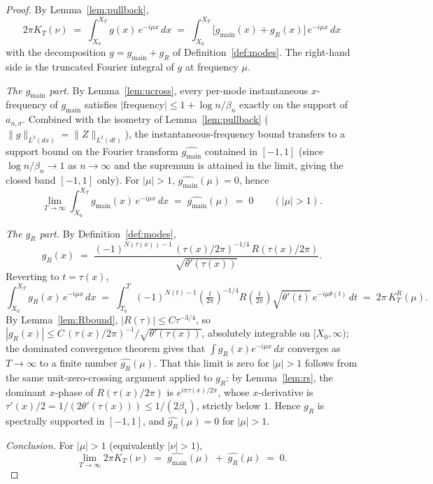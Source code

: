 \documentclass[11pt]{article}
\begin{document}
\begin{proof}
By Lemma~\ref{lem:pullback},
\[
2\pi K_{T}(\nu) \;=\; \int_{X_{0}}^{X_{T}} g(x)\,e^{-i\mu x}\,dx \;=\; \int_{X_{0}}^{X_{T}}\bigl[g_{\mathrm{main}}(x)+g_{R}(x)\bigr]\,e^{-i\mu x}\,dx
\]
with the decomposition $g = g_{\mathrm{main}} + g_{R}$ of Definition~\ref{def:modes}. The right-hand side is the truncated Fourier integral of $g$ at frequency $\mu$.

\emph{The $g_{\mathrm{main}}$ part.} By Lemma~\ref{lem:ucross}, every per-mode instantaneous $x$-frequency of $g_{\mathrm{main}}$ satisfies $|\text{frequency}|\le 1 + \log n/\beta_{n}$ exactly on the support of $a_{n,\sigma}$. Combined with the isometry of Lemma~\ref{lem:pullback} ($\|g\|_{L^{2}(dx)} = \|Z\|_{L^{2}(dt)}$), the instantaneous-frequency bound transfers to a support bound on the Fourier transform $\widehat{g_{\mathrm{main}}}$ contained in $[-1,1]$ (since $\log n/\beta_{n}\to 1$ as $n\to\infty$ and the supremum is attained in the limit, giving the closed band $[-1,1]$ only). For $|\mu|>1$, $\widehat{g_{\mathrm{main}}}(\mu) = 0$, hence
\[
\lim_{T\to\infty}\int_{X_{0}}^{X_{T}} g_{\mathrm{main}}(x)\,e^{-i\mu x}\,dx \;=\; \widehat{g_{\mathrm{main}}}(\mu) \;=\; 0 \qquad (|\mu|>1).
\]

\emph{The $g_{R}$ part.} By Definition~\ref{def:modes},
\[
g_{R}(x) \;=\; \frac{(-1)^{N(\tau(x))-1}\,(\tau(x)/2\pi)^{-1/4}\,R(\tau(x)/2\pi)}{\sqrt{\theta'(\tau(x))}}.
\]
Reverting to $t = \tau(x)$,
\[
\int_{X_{0}}^{X_{T}} g_{R}(x)\,e^{-i\mu x}\,dx \;=\; \int_{T_{0}}^{T}(-1)^{N(t)-1}\!\left(\tfrac{t}{2\pi}\right)^{-1/4}\!R\!\left(\tfrac{t}{2\pi}\right)\sqrt{\theta'(t)}\,e^{-i\mu\theta(t)}\,dt \;=\; 2\pi\,K_{T}^{R}(\mu).
\]
By Lemma~\ref{lem:Rbound}, $|R(\tau)|\le C\tau^{-3/4}$, so $|g_{R}(x)| \le C\,(\tau(x)/2\pi)^{-1}/\sqrt{\theta'(\tau(x))}$, absolutely integrable on $[X_{0},\infty)$; the dominated convergence theorem gives that $\int g_{R}(x)e^{-i\mu x}\,dx$ converges as $T\to\infty$ to a finite number $\widehat{g_{R}}(\mu)$. That this limit is zero for $|\mu|>1$ follows from the same unit-zero-crossing argument applied to $g_{R}$: by Lemma~\ref{lem:rs}, the dominant $x$-phase of $R(\tau(x)/2\pi)$ is $e^{i\pi\tau(x)/2\pi}$, whose $x$-derivative is $\tau'(x)/2 = 1/(2\theta'(\tau(x)))\le 1/(2\beta_{1})$, strictly below $1$. Hence $g_{R}$ is spectrally supported in $[-1,1]$, and $\widehat{g_{R}}(\mu)=0$ for $|\mu|>1$.

\emph{Conclusion.} For $|\mu|>1$ (equivalently $|\nu|>1$),
\[
\lim_{T\to\infty} 2\pi K_{T}(\nu) \;=\; \widehat{g_{\mathrm{main}}}(\mu) \;+\; \widehat{g_{R}}(\mu) \;=\; 0.
\]
\end{proof}
\end{document}
